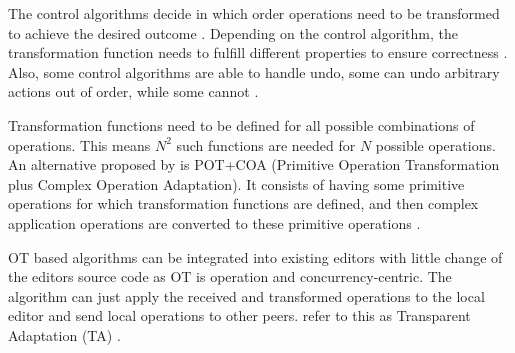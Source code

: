 The control algorithms decide in which order operations need to be transformed to achieve the desired outcome \cite[Section 2.2]{2024-sun-ot-faq}. Depending on the control algorithm, the transformation function needs to fulfill different properties to ensure correctness \cite[Section 2.20]{2024-sun-ot-faq}. Also, some control algorithms are able to handle undo, some can undo arbitrary actions out of order, while some cannot \cite[Section 2.12]{2024-sun-ot-faq}.

Transformation functions need to be defined for all possible combinations of operations. This means $N^2$ such functions are needed for $N$ possible operations. An alternative proposed by  is POT+COA (Primitive Operation
Transformation plus Complex Operation Adaptation). It consists of having some primitive operations for which transformation functions are defined, and then complex application operations are converted to these primitive operations \cite[Section 2.1.3]{2019-sun-difference-ot-crdt-3-building-real-world-applications}.

OT based algorithms can be integrated into existing editors with little change of the editors source code as OT is operation and concurrency-centric. The algorithm can just apply the received and transformed operations to the local editor and send local operations to other peers.  refer to this as Transparent Adaptation (TA) \cite[Section 2.1.2]{2019-sun-difference-ot-crdt-3-building-real-world-applications}.

